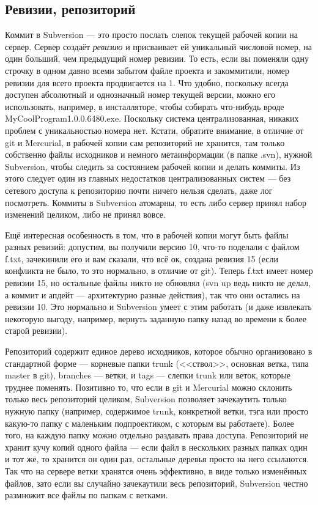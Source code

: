 \documentclass[a5paper]{article}
\begin{document}
\subsection{Ревизии, репозиторий}

Коммит в Subversion --- это просто послать слепок текущей рабочей копии на сервер. Сервер создаёт \textit{ревизию} и присваивает ей уникальный числовой номер, на один больший, чем предыдущий номер ревизии. То есть, если вы поменяли одну строчку в одном давно всеми забытом файле проекта и закоммитили, номер ревизии для всего проекта продвигается на 1. Что удобно, поскольку всегда доступен абсолютный и однозначный номер текущей версии, можно его использовать, например, в инсталляторе, чтобы собирать что-нибудь вроде MyCoolProgram1.0.0.6480.exe. Поскольку система централизованная, никаких проблем с уникальностью номера нет. Кстати, обратите внимание, в отличие от git и Mercurial, в рабочей копии сам репозиторий не хранится, там только собственно файлы исходников и немного метаинформации (в папке .svn), нужной Subversion, чтобы следить за состоянием рабочей копии и делать коммиты. Из этого следует один из главных недостатков централизованных систем --- без сетевого доступа к репозиторию почти ничего нельзя сделать, даже лог посмотреть. Коммиты в Subversion атомарны, то есть либо сервер принял набор изменений целиком, либо не принял вовсе. 

Ещё интересная особенность в том, что в рабочей копии могут быть файлы разных ревизий: допустим, вы получили версию 10, что-то поделали с файлом f.txt, зачекинили его и вам сказали, что всё ок, создана ревизия 15 (если конфликта не было, то это нормально, в отличие от git). Теперь f.txt имеет номер ревизии 15, но остальные файлы никто не обновлял (svn up ведь никто не делал, а коммит и апдейт --- архитектурно разные действия), так что они остались на ревизии 10. Это нормально и Subversion умеет с этим работать (и даже извлекать некоторую выгоду, например, вернуть заданную папку назад во времени к более старой ревизии).

Репозиторий содержит единое дерево исходников, которое обычно организовано в стандартной форме --- корневые папки trunk (<<ствол>>, основная ветка, типа master в git), branches --- ветки, и tags --- слепки trunk или веток, которые труднее поменять. Позитивно то, что если в git и Mercurial можно склонить только весь репозиторий целиком, Subversion позволяет зачекаутить только нужную папку (например, содержимое trunk, конкретной ветки, тэга или просто какую-то папку с маленьким подпроектиком, с которым вы работаете). Более того, на каждую папку можно отдельно раздавать права доступа. Репозиторий не хранит кучу копий одного файла --- если файл в нескольких разных папках один и тот же, то хранится он один раз, остальные деревья просто на него ссылаются. Так что на сервере ветки хранятся очень эффективно, в виде только изменённых файлов, зато если вы случайно зачекаутили весь репозиторий, Subversion честно размножит все файлы по папкам с ветками.
\end{document}
